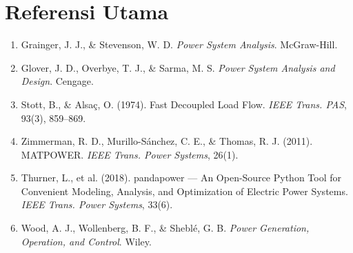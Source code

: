 \documentclass[11pt,a4paper]{report}
\begin{document}
\section{Referensi Utama}
\begin{enumerate}[leftmargin=1.5em]
  \item Grainger, J. J., \& Stevenson, W. D. \textit{Power System Analysis}. McGraw-Hill.
  \item Glover, J. D., Overbye, T. J., \& Sarma, M. S. \textit{Power System Analysis and Design}. Cengage.
  \item Stott, B., \& Alsa\c{c}, O. (1974). Fast Decoupled Load Flow. \textit{IEEE Trans. PAS}, 93(3), 859--869.
  \item Zimmerman, R. D., Murillo-S\'anchez, C. E., \& Thomas, R. J. (2011). MATPOWER. \textit{IEEE Trans. Power Systems}, 26(1).
  \item Thurner, L., et al. (2018). pandapower --- An Open-Source Python Tool for Convenient Modeling, Analysis, and Optimization of Electric Power Systems. \textit{IEEE Trans. Power Systems}, 33(6).
  \item Wood, A. J., Wollenberg, B. F., \& Shebl\'e, G. B. \textit{Power Generation, Operation, and Control}. Wiley.
\end{enumerate}
\end{document}
